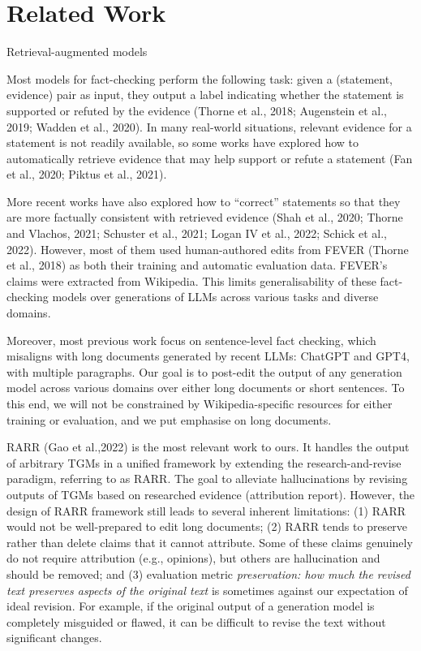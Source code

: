 \section{Related Work}

Retrieval-augmented models

Most models for fact-checking perform the following task: given a (statement, evidence) pair as input, they output a label indicating whether the statement is supported or refuted by the evidence (Thorne et al., 2018; Augenstein et al., 2019; Wadden et al., 2020). In many real-world situations, relevant evidence for a statement is not readily available, so some works have explored how to automatically retrieve evidence that may help support or refute a statement (Fan et al., 2020; Piktus et al., 2021).

More recent works have also explored how to “correct” statements so that they are more factually consistent with retrieved evidence (Shah et al., 2020; Thorne and Vlachos, 2021; Schuster et al., 2021; Logan IV et al., 2022; Schick et al., 2022). However, most of them used human-authored edits from FEVER (Thorne et al., 2018) as both their training and automatic evaluation data. FEVER’s claims were extracted from Wikipedia. This limits generalisability of these fact-checking models over generations of LLMs across various tasks and diverse domains.

Moreover, most previous work focus on sentence-level fact checking, which misaligns with long documents generated by recent LLMs: ChatGPT and GPT4, with multiple paragraphs. Our goal is to post-edit the output of any generation model across various domains over either long documents or short sentences. To this end, we will not be constrained by Wikipedia-specific resources for either training or evaluation, and we put emphasise on long documents.

RARR (Gao et al.,2022) is the most relevant work to ours. It handles the output of arbitrary TGMs in a unified framework by extending the research-and-revise paradigm, referring to as RARR. The goal to alleviate hallucinations by revising outputs of TGMs based on researched evidence (attribution report). However, the design of RARR framework still leads to several inherent limitations: (1) RARR would not be well-prepared to edit long documents; (2) RARR tends to preserve rather than delete claims that it cannot attribute. Some of these claims genuinely do not require attribution (e.g., opinions), but others are hallucination and should be removed; and (3) evaluation metric \textit{preservation: how much the revised text preserves aspects of the original text} is sometimes against our expectation of ideal revision.
For example, if the original output of a generation model is completely misguided or flawed, it can be difficult to revise the text without significant changes.

